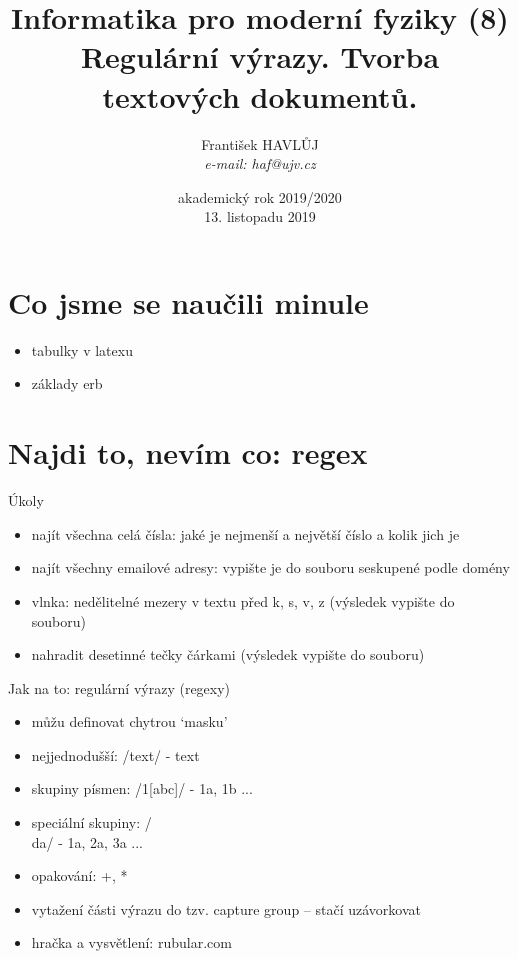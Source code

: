 \documentclass{beamer}
\title[IMF (8)]{Informatika pro moderní fyziky (8)\\Regulární výrazy. Tvorba textových dokumentů.}
\author[Franti\v{s}ek HAVL\r{U}J, ORF ÚJV Řež]{Franti\v{s}ek HAVL\r{U}J\\{\scriptsize \emph{e-mail: haf@ujv.cz}}}
\date{akademický rok 2019/2020\\13. listopadu 2019}
\institute[ORF ÚJV Řež]
{ÚJV Řež\\oddělení Reaktorové fyziky a podpory palivového cyklu}
\begin{document}
\begin{frame}
  \titlepage
\end{frame}

\begin{frame}
  \tableofcontents
\end{frame}

\section{Co jsme se naučili minule}

\begin{frame}{}
  \begin{itemize}
    \item tabulky v latexu
    \item základy erb
  \end{itemize}
\end{frame}

\section{Najdi to, nevím co: regex}

\begin{frame}{Úkoly}
  \begin{itemize}
    \item najít všechna celá čísla: jaké je nejmenší a největší číslo a kolik jich je
    \item najít všechny emailové adresy: vypište je do souboru seskupené podle domény
    \item vlnka: nedělitelné mezery v textu před k, s, v, z (výsledek vypište do souboru)
    \item nahradit desetinné tečky čárkami (výsledek vypište do souboru)
  \end{itemize}
\end{frame}

\begin{frame}{Jak na to: regulární výrazy (regexy)}
  \begin{itemize}
    \item můžu definovat chytrou `masku'
    \item nejjednodušší: /text/ - text
    \item skupiny písmen: /1[abc]/ - 1a, 1b ...
    \item speciální skupiny: /\\da/ - 1a, 2a, 3a ...
    \item opakování: +, *
    \item vytažení části výrazu do tzv. capture group -- stačí uzávorkovat
    \item hračka a vysvětlení: rubular.com
  \end{itemize}
\end{frame}
\end{document}
